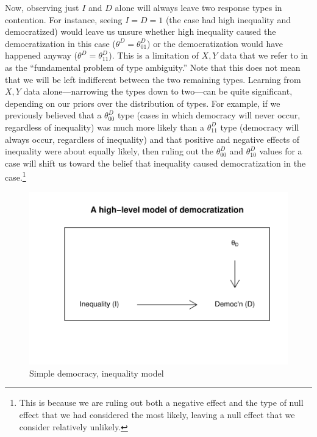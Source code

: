 \documentclass[12pt,]{book}
\let\rmarkdownfootnote\footnote%
\def\footnote{\protect\rmarkdownfootnote}
\begin{document}
Now, observing just \(I\) and \(D\) alone will always leave two response types in contention. For instance, seeing \(I=D=1\) (the case had high inequality and democratized) would leave us unsure whether high inequality caused the democratization in this case (\(\theta^D=\theta_{01}^D\)) or the democratization would have happened anyway (\(\theta^D=\theta_{11}^D\)). This is a limitation of \(X, Y\) data that we refer to in \citet{humphreys2015mixing} as the ``fundamental problem of type ambiguity.'' Note that this does not mean that we will be left indifferent between the two remaining types. Learning from \(X, Y\) data alone---narrowing the types down to two---can be quite significant, depending on our priors over the distribution of types. For example, if we previously believed that a \(\theta_{00}^D\) type (cases in which democracy will never occur, regardless of inequality) was much more likely than a \(\theta_{11}^D\) type (democracy will always occur, regardless of inequality) and that positive and negative effects of inequality were about equally likely, then ruling out the \(\theta_{00}^D\) and \(\theta_{10}^D\) values for a case will shift us toward the belief that inequality caused democratization in the case.\footnote{This is because we are ruling out both a negative effect and the type of null effect that we had considered the most likely, leaving a null effect that we consider relatively unlikely.}

\begin{figure}

{\centering \includegraphics{ii_files/figure-latex/dagdemochigh-1} 

}

\caption{Simple democracy, inequality model}\label{fig:dagdemochigh}
\end{figure}
\end{document}
